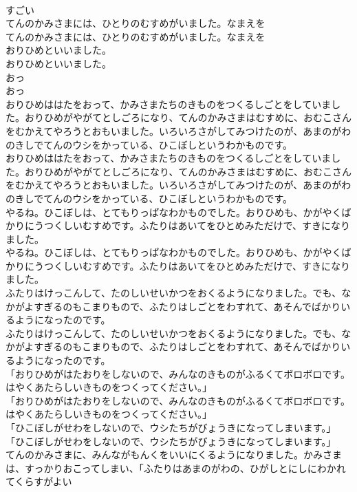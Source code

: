 \documentclass[8pt]{extreport}
\begin{document}
\begin{CJK}{UTF8}{min}
\\	すごい
\\	てんのかみさまには、ひとりのむすめがいました。なまえを
\\	てんのかみさまには、ひとりのむすめがいました。なまえを
\\	おりひめといいました。
\\	おりひめといいました。
\\	おっ
\\	おっ
\\	おりひめははたをおって、かみさまたちのきものをつくるしごとをしていました。おりひめがやがてとしごろになり、てんのかみさまはむすめに、おむこさんをむかえてやろうとおもいました。いろいろさがしてみつけたのが、あまのがわのきしでてんのウシをかっている、ひこぼしというわかものです。
\\	おりひめははたをおって、かみさまたちのきものをつくるしごとをしていました。おりひめがやがてとしごろになり、てんのかみさまはむすめに、おむこさんをむかえてやろうとおもいました。いろいろさがしてみつけたのが、あまのがわのきしでてんのウシをかっている、ひこぼしというわかものです。
\\	やるね。ひこぼしは、とてもりっぱなわかものでした。おりひめも、かがやくばかりにうつくしいむすめです。ふたりはあいてをひとめみただけで、すきになりました。
\\	やるね。ひこぼしは、とてもりっぱなわかものでした。おりひめも、かがやくばかりにうつくしいむすめです。ふたりはあいてをひとめみただけで、すきになりました。
\\	ふたりはけっこんして、たのしいせいかつをおくるようになりました。でも、なかがよすぎるのもこまりもので、ふたりはしごとをわすれて、あそんでばかりいるようになったのです。
\\	ふたりはけっこんして、たのしいせいかつをおくるようになりました。でも、なかがよすぎるのもこまりもので、ふたりはしごとをわすれて、あそんでばかりいるようになったのです。
\\	「おりひめがはたおりをしないので、みんなのきものがふるくてボロボロです。はやくあたらしいきものをつくってください。」
\\	「おりひめがはたおりをしないので、みんなのきものがふるくてボロボロです。はやくあたらしいきものをつくってください。」
\\	「ひこぼしがせわをしないので、ウシたちがびょうきになってしまいます。」
\\	「ひこぼしがせわをしないので、ウシたちがびょうきになってしまいます。」
\\	てんのかみさまに、みんながもんくをいいにくるようになりました。かみさまは、すっかりおこってしまい、「ふたりはあまのがわの、ひがしとにしにわかれてくらすがよい

\end{CJK}
\end{document}
